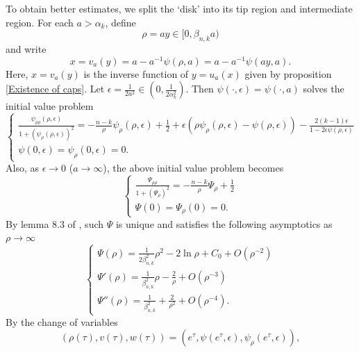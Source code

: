 \documentclass[pdflatex,sn-mathphys-num]{sn-jnl}
\begin{document}
To obtain better estimates, we split the `disk' into its tip region and intermediate region. For each $a > \alpha_k$, define 
\begin{equation}\label{definition of rho}
    \rho = ay \in [0, \beta_{n,k}a)
\end{equation}
and write
\begin{equation}\label{definition of psi}
    x = v_a(y) = a - a^{-1}\psi(\rho, a) = a - a^{-1}\psi(ay, a).
\end{equation}
Here, $x = v_a(y)$ is the inverse function of $y = u_a(x)$ given by proposition \ref{Existence of caps}. Let $\epsilon = \frac{1}{2a^2} \in (0, \frac{1}{2\alpha_k^2})$. Then $\psi(\cdot, \epsilon) = \psi(\cdot, a)$ solves the initial value problem
\begin{equation}\label{IVP for psi}
    \begin{cases}
        \frac{\psi_{\rho\rho}(\rho, \epsilon)}{1 + (\psi_{\rho}(\rho, \epsilon))^2} = -\frac{n - k}{\rho}\psi_{\rho}(\rho, \epsilon) + \frac{1}{2} + \epsilon(\rho\psi_{\rho}(\rho, \epsilon) - \psi(\rho, \epsilon)) - \frac{2(k-1)\epsilon}{1 - 2\epsilon\psi(\rho, \epsilon)}  \\
        \psi(0, \epsilon) = \psi_{\rho}(0, \epsilon) = 0.
    \end{cases}
\end{equation}
Also, as $\epsilon \to 0$ ($a \to \infty$), the above initial value problem becomes
\begin{equation}
    \begin{cases}
        \frac{\Psi_{\rho\rho}}{1 + (\Psi_{\rho})^2} = -\frac{n - k}{\rho}\Psi_{\rho} + \frac{1}{2}  \\
        \Psi(0) = \Psi_{\rho}(0) = 0.
    \end{cases}
\end{equation}
By lemma 8.3 of \cite{ADS}, such $\Psi$ is unique and satisfies the following asymptotics as $\rho \to \infty$
\begin{equation}\label{Asymptotics of Psi}
    \begin{cases}
        \Psi(\rho) = \frac{1}{2\beta_{n,k}^2}\rho^2 - 2\ln \rho +C_0 + O(\rho^{-2}) \\
        \Psi'(\rho) = \frac{1}{\beta_{n,k}^2}\rho - \frac{2}{\rho} + O(\rho^{-3})\\
        \Psi''(\rho) = \frac{1}{\beta_{n,k}^2} + \frac{2}{\rho^2} + O(\rho^{-4}).
    \end{cases}
\end{equation}
By the change of variables
\begin{equation}
    (\rho(\tau), v(\tau), w(\tau)) = (e^{\tau}, \psi(e^{\tau}, \epsilon), \psi_{\rho}(e^{\tau}, \epsilon)),
\end{equation}
\end{document}
